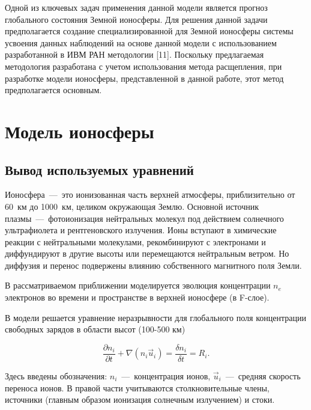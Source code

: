 \documentclass[14pt, a4paper]{extarticle}
\begin{document}
Одной из ключевых задач применения данной модели является прогноз глобального состояния Земной ионосферы. Для решения данной задачи предполагается создание специализированной для Земной ионосферы системы усвоения данных наблюдений на основе данной модели с использованием разработанной в ИВМ РАН методологии [11]. Поскольку предлагаемая методология разработана с учетом использования метода расщепления, при разработке модели ионосферы, представленной в данной работе, этот метод предполагается основным.


\section{Модель ионосферы}

\subsection{Вывод используемых уравнений}

Ионосфера~---~это ионизованная часть верхней атмосферы, приблизительно от 60~км до 1000~км, целиком окружающая Землю. Основной источник плазмы~---~фотоионизация нейтральных молекул под действием солнечного ультрафиолета и рентгеновского излучения. Ионы вступают в химические реакции с нейтральными молекулами, рекомбинируют с электронами и диффундируют в другие высоты или перемещаются нейтральным ветром. Но диффузия и перенос подвержены влиянию собственного магнитного поля Земли.

\medskip

В рассматриваемом приближении моделируется эволюция концентрации $n_e$ электронов во времени и пространстве в верхней ионосфере (в F-слое).

\medskip

В модели решается уравнение неразрывности для глобального поля концентрации свободных зарядов в области высот (100-500 км)

\begin{equation}
\dfrac{\partial n_i}{\partial t} + \nabla \left(n_i \vec{u}_i\right) = \dfrac{\delta n_i}{\delta t} = R_i.
\label{continuity_eq}
\end{equation}

Здесь введены обозначения: $n_i$~---~концентрация ионов, $\vec{u}_i$~---~средняя скорость переноса ионов. В правой части учитываются столкновительные члены, источники (главным образом ионизация солнечным излучением) и стоки.
\end{document}

